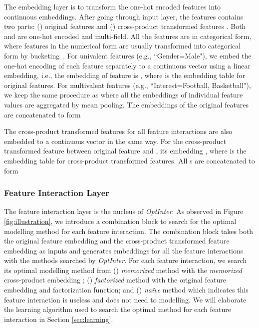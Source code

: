 \documentclass[conference]{IEEEtran}
\begin{document}
The embedding layer is to transform the one-hot encoded features into continuous embeddings. After going through input layer, the features contains two parts: () original features  and () cross-product transformed features . Both  and  are one-hot encoded and multi-field. All the features are in categorical form, where features in the numerical form are usually transformed into categorical form by bucketing~\cite{DeepFM,PNN16}.
For univalent features (e.g., ``Gender=Male"), we embed the one-hot encoding of each feature separately to a continuous vector using a linear embedding, i.e., the embedding  of feature  is , where  is the embedding table for original features. For multivalent features (e.g., ``Interest=Football, Basketball"), we keep the same procedure as \cite{PNN16,PNN19,DeepFM} where all the embeddings of individual feature values are aggregated by mean pooling. The embeddings of the original features are concatenated to form


The cross-product transformed features  for all feature interactions are also embedded to a continuous vector in the same way. For the cross-product transformed feature between original feature  and , its embedding , where  is the embedding table for cross-product transformed features. All s are concatenated to form



\subsubsection{Feature Interaction Layer}
\label{feature}
The feature interaction layer is the nucleus of \textit{OptInter}. As observed in Figure \ref{fig:illustration}, we introduce a combination block to search for the optimal modelling method for each feature interaction. The combination block takes both the original feature embedding  and the cross-product transformed feature embedding  as inputs and generates embeddings  for all the feature interactions with the methods searched by \textit{OptInter}. For each feature interaction, we search its optimal modelling method from () \emph{memorized} method with the \emph{memorized} cross-product embedding ; () \emph{factorized} method with the original feature embedding  and factorization function; and () \emph{naïve} method which indicates this feature interaction is useless and does not need to modelling. We will elaborate the learning algorithm used to search the optimal method for each feature interaction in Section \ref{sec:learning}.
\end{document}
